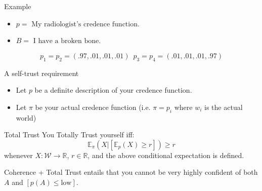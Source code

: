 \documentclass[aspectratio=169, dvipsnames]{beamer}
\newcommand{\R}{\mathbb{R}}
\newcommand{\E}{\mathbb{E}}
\newcommand{\W}{\mathcal{W}}
\begin{document}
\begin{frame}{Example}
  \begin{itemize}
  \item $p = \text{ My radiologist's credence function}$.
  \item $B = \text{ I have a broken bone}$.  
  \end{itemize}
  \begin{figure}
    \centering
  \end{figure}
  \begin{equation*}
    p_1 = p_2 = (.97, .01, .01, .01) \,\,\, p_3 = p_4 = (.01, .01, .01, .97) 
  \end{equation*}
\end{frame}

\begin{frame}{A self-trust requirement}
  \begin{itemize}
  \item Let $p$ be a definite description of your credence function.
  \item Let $\pi$ be your actual credence function (i.e. $\pi=p_i$ where $w_i$ is the actual world)
  \end{itemize}
  \begin{block}{Total Trust}
    You Totally Trust yourself iff:
    \begin{equation}
      \label{totTrust}
      \E_{\pi}(X | [\E_p(X) \geq r]) \geq r
    \end{equation}
    whenever $X: \W \to \R$, $r \in \R$, and the above conditional expectation is defined.
  \end{block}

  Coherence + Total Trust entails that you cannot be very highly confident of both $A$ and $[p(A) \leq \text{low}]$.
\end{frame}
\end{document}
